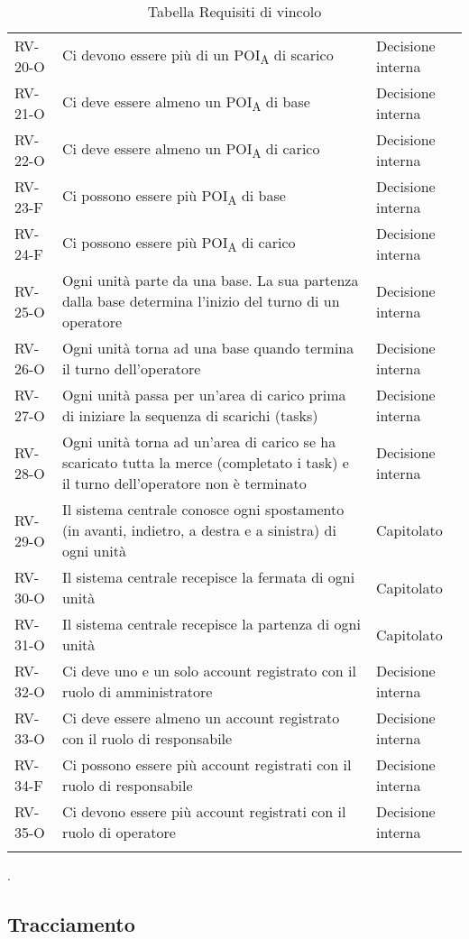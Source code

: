 \begin{longtable}{ 
		>{}p{} 
		>{}p{}
		>{\centering}p{} }
RV-20-O & Ci devono essere più di un \acrshort{POI}\textsubscript{A} di scarico & Decisione interna\tabularnewline
RV-21-O & Ci deve essere almeno un \acrshort{POI}\textsubscript{A} di base & Decisione interna\tabularnewline
RV-22-O & Ci deve essere almeno un \acrshort{POI}\textsubscript{A} di carico & Decisione interna\tabularnewline
RV-23-F & Ci possono essere più \acrshort{POI}\textsubscript{A} di base & Decisione interna\tabularnewline
RV-24-F & Ci possono essere più \acrshort{POI}\textsubscript{A} di carico & Decisione interna\tabularnewline
RV-25-O & Ogni unità parte da una base. La sua partenza dalla base determina l'inizio del turno di un operatore & Decisione interna\tabularnewline
RV-26-O & Ogni unità torna ad una base quando termina il turno dell'operatore & Decisione interna\tabularnewline
RV-27-O & Ogni unità passa per un'area di carico prima di iniziare la sequenza di scarichi (tasks) & Decisione interna\tabularnewline
RV-28-O & Ogni unità torna ad un'area di carico se ha scaricato tutta la merce (completato i task) e il turno dell'operatore non è terminato & Decisione interna\tabularnewline
RV-29-O & Il sistema centrale conosce ogni spostamento (in avanti, indietro, a destra e a sinistra) di ogni unità & Capitolato\tabularnewline
RV-30-O & Il sistema centrale recepisce la fermata di ogni unità & Capitolato\tabularnewline
RV-31-O & Il sistema centrale recepisce la partenza di ogni unità & Capitolato\tabularnewline
RV-32-O	&	Ci deve uno e un solo account registrato con il ruolo di amministratore	&	Decisione interna	\tabularnewline
RV-33-O	&	Ci deve essere almeno un account registrato con il ruolo di responsabile	&	Decisione interna	\tabularnewline
RV-34-F	&	Ci possono essere più account registrati con il ruolo di responsabile	&	Decisione interna	\tabularnewline
RV-35-O	&	Ci devono essere più account registrati con il ruolo di operatore	&	Decisione interna	\tabularnewline
\caption{Tabella Requisiti di vincolo\label{ Tabella Requisiti di vincolo}}
\end{longtable}.
\pagebreak
\subsection{Tracciamento}
